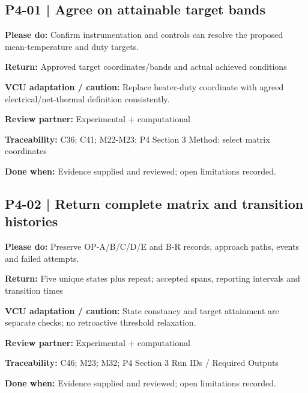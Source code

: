 \documentclass[11pt]{article}
\begin{document}
\begin{minipage}{\textwidth}\small\setlength{\parskip}{2pt}
\subsection*{P4-01 | Agree on attainable target bands}
\textbf{Please do:} Confirm instrumentation and controls can resolve the proposed mean-temperature and duty targets.\par
\textbf{Return:} Approved target coordinates/bands and actual achieved conditions\par
\textbf{VCU adaptation / caution:} Replace heater-duty coordinate with agreed electrical/net-thermal definition consistently.\par
\textbf{Review partner:} Experimental + computational\par
\textbf{Traceability:} C36; C41; M22-M23; P4 Section 3 Method: select matrix coordinates\par
\textbf{Done when:} Evidence supplied and reviewed; open limitations recorded.\par
\end{minipage}\par\vspace{8pt}
\begin{minipage}{\textwidth}\small\setlength{\parskip}{2pt}
\subsection*{P4-02 | Return complete matrix and transition histories}
\textbf{Please do:} Preserve OP-A/B/C/D/E and B-R records, approach paths, events and failed attempts.\par
\textbf{Return:} Five unique states plus repeat; accepted spans, reporting intervals and transition times\par
\textbf{VCU adaptation / caution:} State constancy and target attainment are separate checks; no retroactive threshold relaxation.\par
\textbf{Review partner:} Experimental + computational\par
\textbf{Traceability:} C46; M23; M32; P4 Section 3 Run IDs / Required Outputs\par
\textbf{Done when:} Evidence supplied and reviewed; open limitations recorded.\par
\end{minipage}\par\vspace{8pt}
\end{document}
